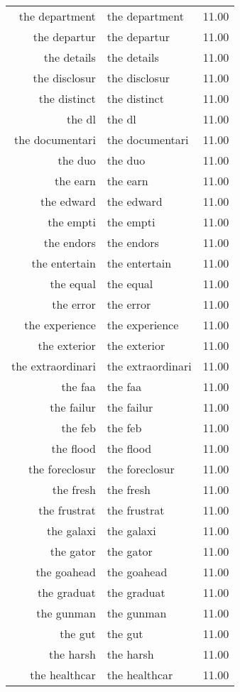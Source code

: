 \begin{table}[ht]
\begin{tabular}{rlr}
  the department & the department & 11.00 \\ 
  the departur & the departur & 11.00 \\ 
  the details & the details & 11.00 \\ 
  the disclosur & the disclosur & 11.00 \\ 
  the distinct & the distinct & 11.00 \\ 
  the dl & the dl & 11.00 \\ 
  the documentari & the documentari & 11.00 \\ 
  the duo & the duo & 11.00 \\ 
  the earn & the earn & 11.00 \\ 
  the edward & the edward & 11.00 \\ 
  the empti & the empti & 11.00 \\ 
  the endors & the endors & 11.00 \\ 
  the entertain & the entertain & 11.00 \\ 
  the equal & the equal & 11.00 \\ 
  the error & the error & 11.00 \\ 
  the experience & the experience & 11.00 \\ 
  the exterior & the exterior & 11.00 \\ 
  the extraordinari & the extraordinari & 11.00 \\ 
  the faa & the faa & 11.00 \\ 
  the failur & the failur & 11.00 \\ 
  the feb & the feb & 11.00 \\ 
  the flood & the flood & 11.00 \\ 
  the foreclosur & the foreclosur & 11.00 \\ 
  the fresh & the fresh & 11.00 \\ 
  the frustrat & the frustrat & 11.00 \\ 
  the galaxi & the galaxi & 11.00 \\ 
  the gator & the gator & 11.00 \\ 
  the goahead & the goahead & 11.00 \\ 
  the graduat & the graduat & 11.00 \\ 
  the gunman & the gunman & 11.00 \\ 
  the gut & the gut & 11.00 \\ 
  the harsh & the harsh & 11.00 \\ 
  the healthcar & the healthcar & 11.00 \\ 

\end{tabular}
\end{table}
